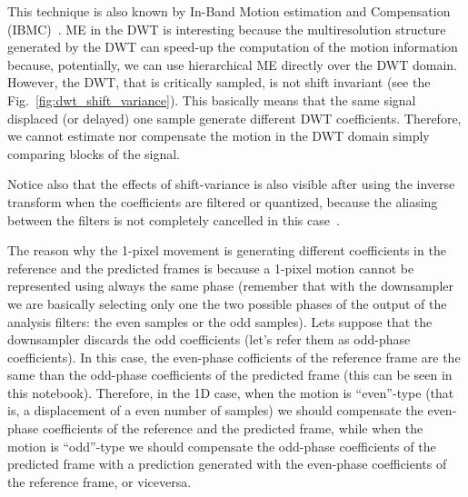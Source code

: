 This technique is also known by In-Band Motion estimation and
Compensation (IBMC)~\cite{andreopoulos2005complete}. ME in the DWT is
interesting because the multiresolution structure generated by the DWT
can speed-up the computation of the motion information because,
potentially, we can use hierarchical ME directly over the DWT
domain. However, the DWT, that is critically sampled, is not shift
invariant (see the Fig.~\ref{fig:dwt_shift_variance}). This basically
means that the same signal displaced (or delayed) one sample generate
different DWT coefficients. Therefore, we cannot estimate nor
compensate the motion in the DWT domain simply comparing blocks of the
signal.

Notice also that the effects of shift-variance is also visible
after using the inverse transform when the coefficients are filtered
or quantized, because the aliasing between the filters is not
completely cancelled in this case~\cite{bradley2003shift}.

The reason why the 1-pixel movement is generating different
coefficients in the reference and the predicted frames is because a
1-pixel motion cannot be represented using always the same phase
(remember that with the downsampler we are basically selecting only
one the two possible phases of the output of the analysis filters: the
even samples or the odd samples). Lets suppose that the downsampler
discards the odd coefficients (let's refer them as odd-phase
coefficients). In this case, the even-phase cofficients of the
reference frame are the same than the odd-phase coefficients of the
predicted frame (this can be seen in this notebook). Therefore, in the
1D case, when the motion is ``even''-type (that is, a displacement of
a even number of samples) we should compensate the even-phase
coefficients of the reference and the predicted frame, while when the
motion is ``odd''-type we should compensate the odd-phase coefficients
of the predicted frame with a prediction generated with the even-phase
coefficients of the reference frame, or viceversa.

